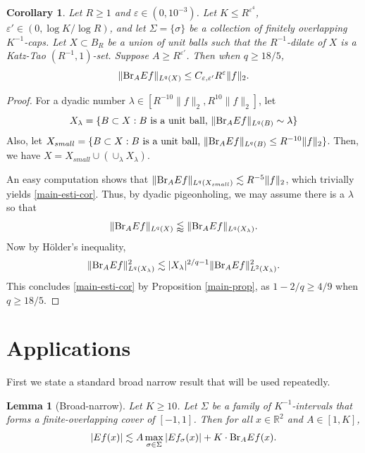 \documentclass{amsart}
\numberwithin{equation}{section}
\newtheorem{lemma}[theorem]{Lemma}
\newtheorem{corollary}[theorem]{Corollary}
\newcommand{\e}{\varepsilon}
\newcommand{\la}{\lambda}
\newcommand{\si}{\sigma}
\newcommand{\Si}{\Sigma}
\newcommand{\ZR}{\mathbb{R}}
\newcommand{\BR}{{\rm{Br}}}
\begin{document}
\begin{corollary}
\label{main-cor}
Let $R\geq 1$ and $\e\in(0,10^{-3})$.
Let $K\leq R^{\e^4}$, $\e'\in(0,\log K/\log R)$, and let $\Si=\{\si\}$ be a collection of finitely overlapping $K^{-1}$-caps. 
Let $X\subset B_R$ be a union of unit balls such that the $R^{-1}$-dilate of  $X$ is a Katz-Tao $(R^{-1},1)$-set.
Suppose $A\geq R^{\e'}$.
Then when $q\geq 18/5$,
\begin{equation}
\label{main-esti-cor}
    \|\BR_A Ef\|_{L^q(X)}\leq C_{\e,\e'} R^{\e}\|f\|_2.
\end{equation}
\end{corollary}
\begin{proof}
For a dyadic number $\la\in [R^{-10}\|f\|_2,R^{10}\|f\|_2]$, let 
\begin{equation}
    X_\la=\{B\subset X:B\text{ is a unit ball, }\|\BR_A Ef\|_{L^q(B)}\sim\la\}
\end{equation}
Also, let $X_{small}=\{B\subset X: B\text{ is a unit ball, }\|\BR_A Ef\|_{L^q(B)}\leq R^{-10}\|f\|_2\}$.
Then, we have $X=X_{small}\cup(\cup_{\la}X_\la)$.

An easy computation shows that $ \|\BR_A Ef\|_{L^q(X_{small})}\lesssim R^{-5}\|f\|_2$, which trivially yields \eqref{main-esti-cor}. 
Thus, by dyadic pigeonholing, we may assume there is a $\la$ so that
\begin{equation}
    \|\BR_A Ef\|_{L^q(X)}\lessapprox\|\BR_A Ef\|_{L^q(X_\la)}.
\end{equation}
Now by H\"older's inequality,
\begin{equation}
    \|\BR_A Ef\|_{L^q(X_\la)}^2\lesssim |X_\la|^{2/q-1}\|\BR_A Ef\|_{L^2(X_\la)}^2.
\end{equation}
This concludes \eqref{main-esti-cor} by Proposition \ref{main-prop}, as $1-2/q\geq 4/9$ when $q\geq 18/5$.
\qedhere

\end{proof}


\bigskip


\section{Applications}



First we state a standard broad narrow result that will be used repeatedly.
\begin{lemma}[Broad-narrow]
	\label{broad-narrow-lem}
	Let $K\geq10$.
	Let $\Si$ be a family of $K^{-1}$-intervals that forms a finite-overlapping cover of $[-1,1]$.
	Then for all $x\in\ZR^2$ and $A\in[1,K]$,  
	\begin{align}
	\label{broad-narrow}
		|Ef(x)|\lesssim A\max_{\si\in\Si}|Ef_{\si}(x)|+K\cdot \BR_AEf(x).
	\end{align}
\end{lemma}
\end{document}
